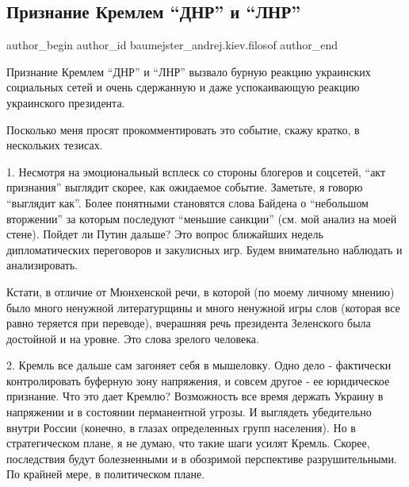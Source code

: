  
 
 
 
 
 
\subsection{Признание Кремлем \enquote{ДНР} и \enquote{ЛНР}}
\label{sec:22_02_2022.fb.baumejster_andrej.kiev.filosof.1.kreml_dnr_lnr}
 
\ifcmt
 author_begin
   author_id baumejster_andrej.kiev.filosof
 author_end
\fi

Признание Кремлем \enquote{ДНР} и \enquote{ЛНР} вызвало бурную реакцию
украинских социальных сетей и очень сдержанную и даже успокаивающую реакцию
украинского президента. 

Посколько меня просят прокомментировать это событие, скажу кратко, в нескольких
тезисах.

1. Несмотря на эмоциональный всплеск со стороны блогеров и соцсетей, \enquote{акт
признания} выглядит скорее, как ожидаемое событие. Заметьте, я говорю \enquote{выглядит
как}. Более понятными становятся слова Байдена о \enquote{небольшом вторжении} за
которым последуют \enquote{меньшие санкции} (см. мой анализ на моей стене). Пойдет ли
Путин дальше? Это вопрос ближайших недель дипломатических переговоров и
закулисных игр. Будем внимательно наблюдать и анализировать. 

Кстати, в отличие от Мюнхенской речи, в которой (по моему личному мнению) было
много ненужной литературщины и много ненужной игры слов (которая все равно
теряется при переводе), вчерашняя речь президента Зеленского была достойной и
на уровне. Это слова зрелого человека. 

2. Кремль все дальше сам загоняет себя в мышеловку. Одно дело - фактически
контролировать буферную зону напряжения, и совсем другое - ее юридическое
признание. Что это дает Кремлю? Возможность все время держать Украину в
напряжении и в состоянии перманентной угрозы. И выглядеть убедительно внутри
России (конечно, в глазах определенных групп населения). Но в стратегическом
плане, я не думаю, что такие шаги усилят Кремль. Скорее, последствия будут
болезненными и в обозримой перспективе разрушительными. По крайней мере, в
политическом плане. 

